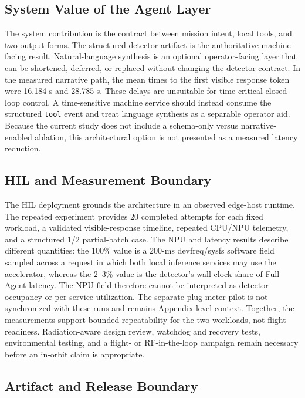 \documentclass[10pt,letterpaper]{article}
\begin{document}
\subsection{System Value of the Agent Layer}

The system contribution is the contract between mission intent, local tools, and two output forms. The structured detector artifact is the authoritative machine-facing result. Natural-language synthesis is an optional operator-facing layer that can be shortened, deferred, or replaced without changing the detector contract. In the measured narrative path, the mean times to the first visible response token were 16.184 s and 28.785 s. These delays are unsuitable for time-critical closed-loop control. A time-sensitive machine service should instead consume the structured \texttt{tool} event and treat language synthesis as a separable operator aid. Because the current study does not include a schema-only versus narrative-enabled ablation, this architectural option is not presented as a measured latency reduction.

\subsection{HIL and Measurement Boundary}

The HIL deployment grounds the architecture in an observed edge-host runtime. The repeated experiment provides 20 completed attempts for each fixed workload, a validated visible-response timeline, repeated CPU/NPU telemetry, and a structured 1/2 partial-batch case. The NPU and latency results describe different quantities: the 100\% value is a 200-ms devfreq/sysfs software field sampled across a request in which both local inference services may use the accelerator, whereas the 2--3\% value is the detector's wall-clock share of Full-Agent latency. The NPU field therefore cannot be interpreted as detector occupancy or per-service utilization. The separate plug-meter pilot is not synchronized with these runs and remains Appendix-level context. Together, the measurements support bounded repeatability for the two workloads, not flight readiness. Radiation-aware design review, watchdog and recovery tests, environmental testing, and a flight- or RF-in-the-loop campaign remain necessary before an in-orbit claim is appropriate.

\subsection{Artifact and Release Boundary}
\end{document}
